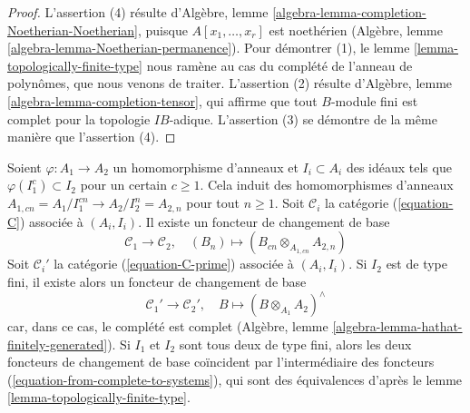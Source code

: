 \begin{proof}
L'assertion (4) résulte d'Algèbre, lemme
\ref{algebra-lemma-completion-Noetherian-Noetherian}, puisque
$A[x_1, \ldots, x_r]$ est noethérien (Algèbre, lemme
\ref{algebra-lemma-Noetherian-permanence}). Pour démontrer (1), le lemme
\ref{lemma-topologically-finite-type} nous ramène au cas du complété de
l'anneau de polynômes, que nous venons de traiter. L'assertion (2) résulte
d'Algèbre, lemme \ref{algebra-lemma-completion-tensor}, qui affirme que tout
$B$-module fini est complet pour la topologie $IB$-adique. L'assertion (3) se
démontre de la même manière que l'assertion (4).
\end{proof}

\begin{remark}
\label{remark-base-change}
Soient $\varphi : A_1 \to A_2$ un homomorphisme d'anneaux et
$I_i \subset A_i$ des idéaux tels que $\varphi(I_1^c) \subset I_2$ pour un
certain $c \geq 1$. Cela induit des homomorphismes d'anneaux
$A_{1, cn} = A_1/I_1^{cn} \to A_2/I_2^n = A_{2, n}$ pour tout $n \geq 1$.
Soit $\mathcal{C}_i$ la catégorie (\ref{equation-C}) associée à $(A_i, I_i)$.
Il existe un foncteur de changement de base
\begin{equation}
\label{equation-base-change-systems}
\mathcal{C}_1 \longrightarrow \mathcal{C}_2,\quad
(B_n) \longmapsto (B_{cn} \otimes_{A_{1, cn}} A_{2, n})
\end{equation}
Soit $\mathcal{C}_i'$ la catégorie (\ref{equation-C-prime}) associée à
$(A_i, I_i)$. Si $I_2$ est de type fini, il existe alors un foncteur de
changement de base
\begin{equation}
\label{equation-base-change-complete}
\mathcal{C}_1' \longrightarrow \mathcal{C}_2',\quad
B \longmapsto (B \otimes_{A_1} A_2)^\wedge
\end{equation}
car, dans ce cas, le complété est complet (Algèbre, lemme
\ref{algebra-lemma-hathat-finitely-generated}). Si $I_1$ et $I_2$ sont tous
deux de type fini, alors les deux foncteurs de changement de base coïncident
par l'intermédiaire des foncteurs
(\ref{equation-from-complete-to-systems}), qui sont des équivalences d'après
le lemme \ref{lemma-topologically-finite-type}.
\end{remark}

